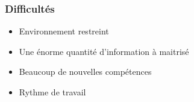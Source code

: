 \begin{frame}
    \frametitle{Difficultés}
    \begin{itemize}
        \item Environnement restreint
        \item Une énorme quantité d'information à maitrisé
        \item Beaucoup de nouvelles compétences
        \item Rythme de travail
    \end{itemize}
\end{frame}